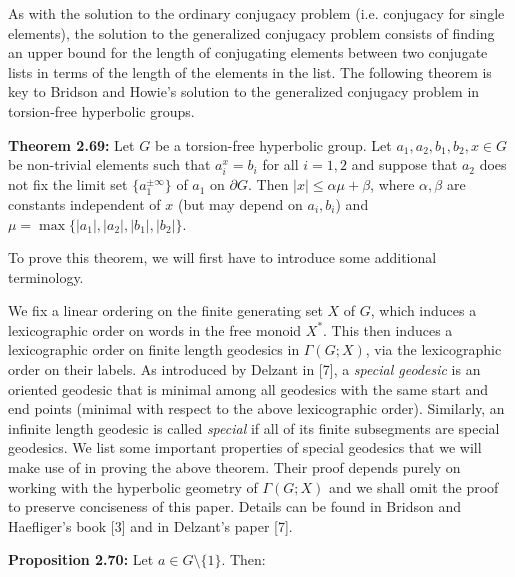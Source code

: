 \documentclass[12pt]{article}
\newcommand{\vs}{\vskip10pt}
\begin{document}
	\vs 
	
	As with the solution to the ordinary conjugacy problem (i.e. conjugacy for single elements), the solution to the generalized conjugacy problem consists of finding an upper bound for the length of conjugating elements between two conjugate lists in terms of the length of the elements in the list. The following theorem is key to Bridson and Howie's solution to the generalized conjugacy problem in torsion-free hyperbolic groups.
	
	\vs 
	
	\textbf{Theorem 2.69: } Let $G$ be a torsion-free hyperbolic group. Let $a_1, a_2, b_1, b_2, x \in G$ be non-trivial elements such that $a_i^x = b_i$ for all $i = 1,2$ and suppose that $a_2$ does not fix the limit set $\{a_1^{\pm \infty}\}$ of $a_1$ on $\partial G$. Then $\vert x \vert \leq \alpha \mu + \beta$, where $\alpha, \beta$ are constants independent of $x$ (but may depend on $a_i, b_i$) and $\mu = \max \{\vert a_1 \vert, \vert a_2 \vert, \vert b_1 \vert, \vert b_2 \vert \}$. 
	
	\vs 
	
	To prove this theorem, we will first have to introduce some additional terminology. 
	
	\vs 
	
	We fix a linear ordering on the finite generating set $X$ of $G$, which induces a lexicographic order on words in the free monoid $X^*$. This then induces a lexicographic order on finite length geodesics in $\Gamma(G; X)$, via the lexicographic order on their labels. As introduced by Delzant in [7], a \textit{special geodesic} is an oriented geodesic that is minimal among all geodesics with the same start and end points (minimal with respect to the above lexicographic order). Similarly, an infinite length geodesic is called \textit{special} if all of its finite subsegments are special geodesics. We list some important properties of special geodesics that we will make use of in proving the above theorem. Their proof depends purely on working with the hyperbolic geometry of $\Gamma(G; X)$ and we shall omit the proof to preserve conciseness of this paper. Details can be found in Bridson and Haefliger's book [3] and in Delzant's paper [7]. 
	
	\vs 
	
	\textbf{Proposition 2.70: } Let $a \in G \setminus \{1\}$. Then: 
	
\end{document}
